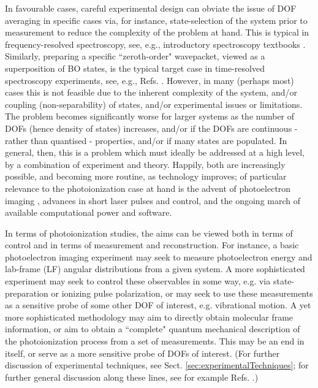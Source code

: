 In favourable cases, careful experimental design can obviate the issue of DOF averaging in specific cases via, for instance, state-selection of the system prior to measurement to reduce the complexity of the problem at hand. This is typical in frequency-resolved spectroscopy, see, e.g., introductory spectroscopy textbooks \cite{bunkerMolSymm, herzberg1945molecular, hollasHighRes}. Similarly, preparing a specific ``zeroth-order" wavepacket, viewed as a superposition of BO states, is the typical target case in time-resolved spectroscopy experiments, see, e.g., Refs. \cite{Tannor2007,Stolow2008,wu2011TimeresolvedPhotoelectronSpectroscopy}. However, in many (perhaps most) cases this is not feasible due to the inherent complexity of the system, and/or coupling (non-separability) of states, and/or experimental issues or limitations. The problem becomes significantly worse for larger systems as the number of DOFs (hence density of states) increases, and/or if the DOFs are continuous - rather than quantised - properties, and/or if many states are populated. In general, then, this is a problem which must ideally be addressed at a high level, by a combination of experiment and theory. Happily, both are increasingly possible, and becoming more routine, as technology improves; of particular relevance to the photoionization case at hand is the advent of photoelectron imaging \cite{Whitaker2003}, advances in short laser pulses and control, and the ongoing march of available computational power and software.

In terms of photoionization studies, the aims can be viewed both in terms of control and in terms of measurement and reconstruction. For instance, a basic photoelectron imaging experiment may seek to measure photoelectron energy and lab-frame (LF) angular distributions from a given system. A more sophisticated experiment may seek to control these observables in some way, e.g. via state-preparation or ionizing pulse polarization, or may seek to use these measurements as a sensitive probe of some other DOF of interest, e.g. vibrational motion. A yet more sophisticated methodology may aim to directly obtain molecular frame information, or aim to obtain a ``complete" quantum mechanical description of the photoionization process from a set of measurements. This may be an end in itself, or serve as a more sensitive probe of DOFs of interest. (For further discussion of experimental techniques, see Sect. \ref{sec:experimentalTechniques}; for further general discussion along these lines, see for example Refs. \cite{hockett2018QMP1, kleinpoppen2013perfect, Reid2012, Stolow2008}.)